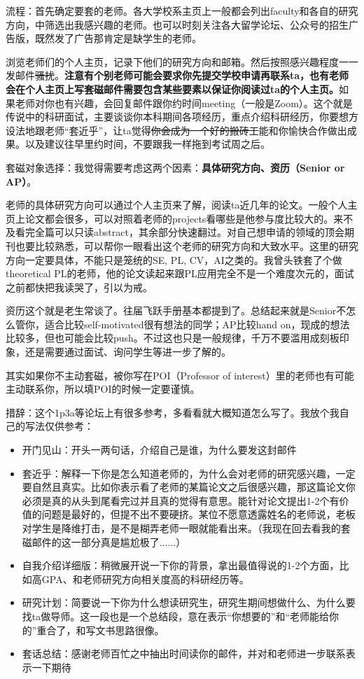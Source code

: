 流程：首先确定要套的老师。各大学校系主页上一般都会列出faculty和各自的研究方向，中筛选出我感兴趣的老师。也可以时刻关注各大留学论坛、公众号的招生广告版，既然发了广告那肯定是缺学生的老师。

浏览老师们的个人主页，记录下他们的研究方向和邮箱。然后按照感兴趣程度一一发邮件\sout{骚扰}。{\bf{注意有个别老师可能会要求你先提交学校申请再联系ta，也有老师会在个人主页上写套磁邮件需要包含某些要素以保证你阅读过ta的个人主页。}}如果老师对你也有兴趣，会回复邮件跟你约时间meeting（一般是Zoom）。这个就是传说中的科研面试，主要谈谈你本科期间各项经历，重点介绍科研经历，你要想方设法地跟老师“套近乎”，让ta觉得\sout{你会成为一个好的搬砖工}能和你愉快合作做出成果。以及建议往早里约时间，不要跟我一样拖到考试周之后。

套磁对象选择：我觉得需要考虑这两个因素：{\bf{具体研究方向、资历（Senior or AP）}}。

老师的具体研究方向可以通过个人主页来了解，阅读ta近几年的论文。一般个人主页上论文都会很多，可以对照着老师的projects看哪些是他参与度比较大的。来不及看完全篇可以只读abstract，其余部分快速翻过。对自己想申请的领域的顶会期刊也要比较熟悉，可以帮你一眼看出这个老师的研究方向和大致水平。这里的研究方向一定要具体，不能只是笼统的SE, PL, CV，AI之类的。我曾头铁套了个做theoretical PL的老师，他的论文读起来跟PL应用完全不是一个难度次元的，面试之前都快把我读哭了，引以为戒。

资历这个就是老生常谈了。往届飞跃手册基本都提到了。总结起来就是Senior不怎么管你，适合比较self-motivated很有想法的同学；AP比较hand on，现成的想法比较多，但也可能会比较push。不过这也只是一般规律，千万不要滥用成刻板印象，还是需要通过面试、询问学生等进一步了解的。

其实如果你不主动套磁，被你写在POI（Professor of interest）里的老师也有可能主动联系你，所以填POI的时候一定要谨慎。

措辞：这个1p3a等论坛上有很多参考，多看看就大概知道怎么写了。我放个我自己的写法仅供参考：
\begin{itemize}
    \item 开门见山：开头一两句话，介绍自己是谁，为什么要发这封邮件
    \item 套近乎：解释一下你是怎么知道老师的，为什么会对老师的研究感兴趣，一定要自然且真实。比如你表示看了老师的某篇论文之后很感兴趣，那这篇论文你必须是真的从头到尾看完过并且真的觉得有意思。能针对论文提出1-2个有价值的问题是最好的，但提不出不要硬挤。某位不愿意透露姓名的老师说，老板对学生是降维打击，是不是糊弄老师一眼就能看出来。（我现在回去看我的套磁邮件的这一部分真是尴尬极了......）
    \item 自我介绍详细版：稍微展开说一下你的背景，拿出最值得说的1-2个方面，比如高GPA、和老师研究方向相关度高的科研经历等。
    \item 研究计划：简要说一下你为什么想读研究生，研究生期间想做什么、为什么要找ta做导师。这一段也是一个总结段，意在表示“你想要的”和“老师能给你的”重合了，和写文书思路很像。
    \item 套话总结：感谢老师百忙之中抽出时间读你的邮件，并对和老师进一步联系表示一下期待
\end{itemize}

